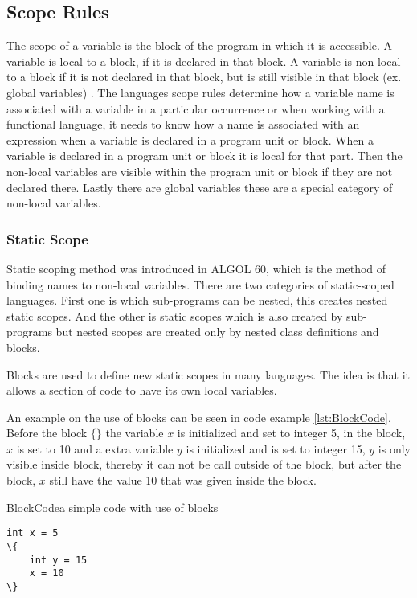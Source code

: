 \subsection{Scope Rules}
\label{sec:scoperules}
The scope of a variable is the block of the program in which it is accessible. A variable is local to a block, if it is declared in that block. A variable is non-local to a block if it is not declared in that block, but is still visible in that block (ex. global variables) \citep{sebesta}.
The languages scope rules determine how a variable name is associated with a variable in a particular occurrence or when working with a functional language, it needs to know how a name is associated with an expression when a variable is declared in a program unit or block. When a variable is declared in a program unit or block it is local for that part. Then the non-local variables are visible within the program unit or block if they are not declared there. Lastly there are global variables these are a special category of non-local variables.

\subsubsection{Static Scope}
Static scoping method was introduced in ALGOL 60, which is the method of binding names to non-local variables. There are two categories of static-scoped languages. First one is which sub-programs can be nested, this creates nested static scopes. And the other is static scopes which is also created by sub-programs but nested scopes are created only by nested class definitions and blocks.

Blocks are used to define new static scopes in many languages. The idea is that it allows a section of code to have its own local variables.

An example on the use of blocks can be seen in code example \ref{lst:BlockCode}. Before the block $\{ \}$ the variable $x$ is initialized and set to integer 5, in the block, $x$ is set to 10 and a extra variable $y$ is initialized and is set to integer 15, $y$ is only visible inside block, thereby it can not be call outside of the block, but after the block, $x$ still have the value 10 that was given inside the block.

\begin{code}{BlockCode}{a simple code with use of blocks}
\begin{lstlisting}
int x = 5
\{
    int y = 15
    x = 10
\} 
\end{lstlisting}
\end{code}

